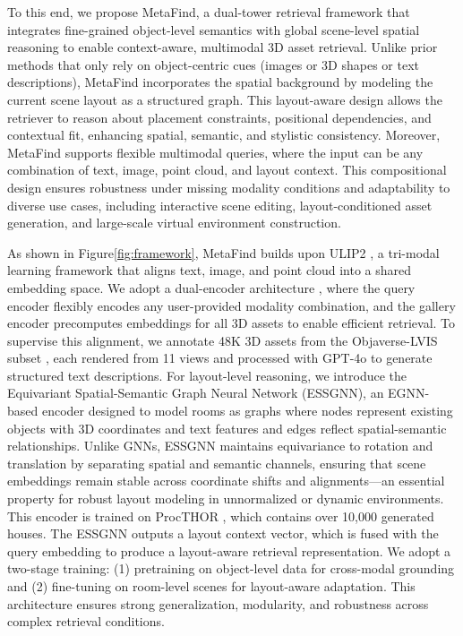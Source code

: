 \documentclass{article}
\begin{document}
To this end, we propose MetaFind, a dual-tower retrieval framework that integrates fine-grained object-level semantics with global scene-level spatial reasoning to enable context-aware, multimodal 3D asset retrieval. Unlike prior methods that only rely on object-centric cues (images or 3D shapes or text descriptions), MetaFind incorporates the spatial background by modeling the current scene layout as a structured graph. This layout-aware design allows the retriever to reason about placement constraints, positional dependencies, and contextual fit, enhancing spatial, semantic, and stylistic consistency. Moreover, MetaFind supports flexible multimodal queries, where the input can be any combination of text, image, point cloud, and layout context. This compositional design ensures robustness under missing modality conditions and adaptability to diverse use cases, including interactive scene editing, layout-conditioned asset generation, and large-scale virtual environment construction.

As shown in Figure\ref{fig:framework}, MetaFind builds upon ULIP2 \cite{xue2024ulip}, a tri-modal learning framework that aligns text, image, and point cloud into a shared embedding space. We adopt a dual-encoder architecture \cite{karpukhin2020dense}, where the query encoder flexibly encodes any user-provided modality combination, and the gallery encoder precomputes embeddings for all 3D assets to enable efficient retrieval. To supervise this alignment, we annotate 48K 3D assets from the Objaverse-LVIS subset \cite{deitke2023objaverse}, each rendered from 11 views and processed with GPT-4o to generate structured text descriptions. For layout-level reasoning, we introduce the Equivariant Spatial-Semantic Graph Neural Network (ESSGNN), an EGNN-based encoder designed to model rooms as graphs where nodes represent existing objects with 3D coordinates and text features and edges reflect spatial-semantic relationships. Unlike GNNs, ESSGNN maintains equivariance to rotation and translation by separating spatial and semantic channels, ensuring that scene embeddings remain stable across coordinate shifts and alignments—an essential property for robust layout modeling in unnormalized or dynamic environments. This encoder is trained on ProcTHOR \cite{deitke2022}, which contains over 10,000 generated houses. The ESSGNN outputs a layout context vector, which is fused with the query embedding to produce a layout-aware retrieval representation. We adopt a two-stage training: (1) pretraining on object-level data for cross-modal grounding and (2) fine-tuning on room-level scenes for layout-aware adaptation. This architecture ensures strong generalization, modularity, and robustness across complex retrieval conditions.
\end{document}
